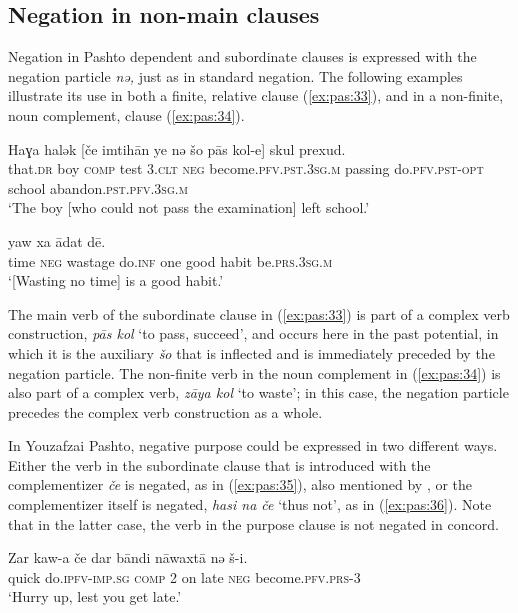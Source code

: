 \documentclass[output=paper,colorlinks,citecolor=brown]{langscibook}
\begin{document}
\subsection{Negation in non-main clauses}\label{sec:pas:2.4}

Negation in Pashto dependent and subordinate clauses is expressed with the negation particle \textit{nə,} just as in standard negation. The following examples illustrate its use in both a finite, relative clause (\ref{ex:pas:33}), and in a non-finite, noun complement, clause (\ref{ex:pas:34}).

\ea\label{ex:pas:33} 
     \gll  Haɣa halək [če imtih\={a}n ye nə šo p\={a}s kol{}-e] skul prexud.\\ 
     that.\textsc{dr} boy \textsc{comp} test \textsc{3.clt} \textsc{neg} become.\textsc{pfv.pst.3sg.m} passing do.\textsc{pfv.pst{}-opt} school abandon.\textsc{pst.pfv.3sg.m} \\
    \glt ‘The boy [who could not pass the examination] left school.’
\z 

\ea\label{ex:pas:34} 
     \gll [Ṭem nə z\={a}ya kol] yaw xa \={a}dat d\={e}.  \\ 
          time \textsc{neg} wastage do.\textsc{inf} one good habit be.\textsc{prs.3sg.m}\\
    \glt ‘[Wasting no time] is a good habit.’
\z 

The main verb of the subordinate clause in (\ref{ex:pas:33}) is part of a complex verb construction, \textit{pās kol} ‘to pass, succeed’, and occurs here in the past potential, in which it is the auxiliary \textit{šo} that is inflected and is immediately preceded by the negation particle. The non-finite verb in the noun complement in (\ref{ex:pas:34}) is also part of a complex verb, \textit{z\={a}ya kol} ‘to waste’; in this case, the negation particle precedes the complex verb construction as a whole.

In Youzafzai Pashto, negative purpose could be expressed in two different ways. Either the verb in the subordinate clause that is introduced with the complementizer \textit{če} is negated, as in (\ref{ex:pas:35}), also mentioned by \citet[85]{Pate2012}, or the complementizer itself is negated, \textit{hasi na če} ‘thus not’, as in (\ref{ex:pas:36}). Note that in the latter case, the verb in the purpose clause is not negated in concord.

\ea\label{ex:pas:35} 
    \gll  Zar kaw-a če dar b\={a}ndi n\={a}waxt\={a}  nə š-i. \\ 
          quick do.\textsc{ipfv{}-imp.sg} \textsc{comp} \textsc{2} on late \textsc{neg} become.\textsc{pfv.prs{}-3}\\
    \glt ‘Hurry up, lest you get late.’
\z 
\end{document}
